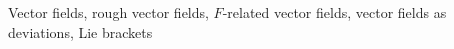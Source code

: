 Vector fields, rough vector fields, \(F\)-related vector fields, vector fields as deviations, Lie brackets